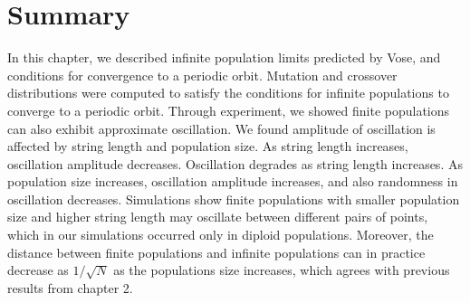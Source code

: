 \section{Summary}
In this chapter, we described infinite population limits predicted by Vose, and conditions 
for convergence to a periodic orbit. Mutation and crossover distributions were computed 
to satisfy the conditions for infinite populations to converge to a periodic orbit. Through experiment, 
we showed finite populations can also exhibit approximate oscillation. 
We found amplitude of oscillation is affected by string length and population size. 
As string length increases, oscillation amplitude decreases. Oscillation degrades as string length increases. 
As population size increases, oscillation amplitude increases, and also randomness in oscillation decreases. 
Simulations show finite populations with smaller population size and higher string length may oscillate 
between different pairs of points, which in our simulations occurred only in diploid populations. 
Moreover, the distance between finite populations and infinite populations can in practice decrease 
as $1/\sqrt{N}$ as the populations size increases, which agrees with previous results from 
chapter 2.





 
